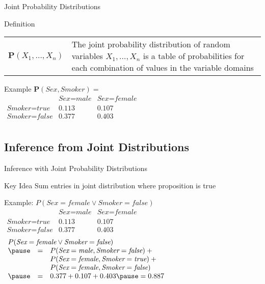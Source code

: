\documentclass[14pt]{beamer}
\begin{document}
\begin{frame}{Joint Probability Distributions}
	\begin{block}{Definition}
		\begin{tabular}{@{}lm{}@{}}
			\large $\mathbf{P}(X_1, \ldots, X_n)$
			&
			The \alert{joint probability distribution} of random variables $X_1, \ldots, X_n$ is a table of probabilities for each combination of values in the variable domains
		\end{tabular}
	\end{block}
	\pause
	\begin{block}{Example}
		$\mathbf{P}(\textit{Sex},\textit{Smoker}) = \mbox{}$ \\[.25em]
		\tab
		$
		\begin{array}{lcc}
			                           & \textit{Sex}=\textit{male} & \textit{Sex}=\textit{female} \\
			\textit{Smoker}=\textit{true}  & 0.113                  & 0.107 \\
			\textit{Smoker}=\textit{false} & 0.377                  & 0.403 \\
		\end{array}
		$
	\end{block}
\end{frame}


\subsection{Inference from Joint Distributions}


\begin{frame}[label=inference-joint-distributions]{\large Inference with Joint Probability Distributions}
\begin{block}{Key Idea}
Sum entries in joint distribution where proposition is true
\end{block}
\pause
\begin{block}{Example: $P(\textit{Sex}=\textit{female} \lor \textit{Smoker}=\textit{false})$}
$
\begin{array}{lcc}
& \textit{Sex}=\textit{male} & \textit{Sex}=\textit{female} \\
\textit{Smoker}=\textit{true}  & 0.113                  & 0.107 \\
\textit{Smoker}=\textit{false} & 0.377                  & 0.403 \\
\end{array}
$
\\[0.5em]
\pause
$
\begin{array}{lll}
\lefteqn{P(\textit{Sex}=\textit{female} \lor \textit{Smoker}=\textit{false})} \\
\pause
& = & P(\textit{Sex}=\textit{male},\textit{Smoker}=\textit{false}) + \mbox{}\\
&   & P(\textit{Sex}=\textit{female},\textit{Smoker}=\textit{true}) + \mbox{}\\
&   & P(\textit{Sex}=\textit{female},\textit{Smoker}=\textit{false})\\
\pause
& = & 0.377 + 0.107 + 0.403 \pause = 0.887
\end{array}
$
\end{block}
\end{frame}
\end{document}
